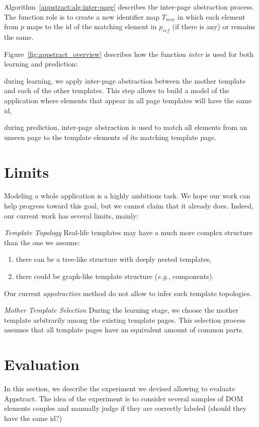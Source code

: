 Algorithm~\ref{appstract:alg:inter-page} describes the inter-page abstraction process.
The function role is to create a new identifier map $T_{new}$ in which each element from $p$ maps to the id of the matching element in $p_{ref}$ (if there is any) or remains the same.

Figure~\ref{fig:appstract_overview} describes how the function \emph{inter} is used for both learning and prediction:
\begin{compactenum}
    \item during learning, we apply inter-page abstraction between the mother template and each of the other templates. This step allows to build a model of the application where elements that appear in all page templates will have the same id,
    \item during prediction, inter-page abstraction is used to match all elements from an unseen page to the template elements of its matching template page.
\end{compactenum}

\section{Limits}
Modeling a whole application is a highly ambitious task.
We hope our work can help progress toward this goal, but we cannot claim that it already does.
Indeed, our current work has several limits, mainly:

\emph{Template Topology}
Real-life templates may have a much more complex structure than the one we assume:
\begin{enumerate}
\item there can be a tree-like structure with deeply nested templates,
\item there could be graph-like template structure (\emph{e.g.}, components).
\end{enumerate}
Our current \emph{appstraction} method do not allow to infer such template topologies.

\emph{Mother Template Selection}
During the learning stage, we choose the mother template arbitrarily among the existing template pages.
This selection process assumes that all template pages have an equivalent amount of common parts.

\section{Evaluation}\label{appstract:sec:evaluation}
In this section, we describe the experiment we devised allowing to evaluate Appstract.
The idea of the experiment is to consider several samples of DOM elements couples and manually judge if they are correctly labeled (should they have the same id?)

